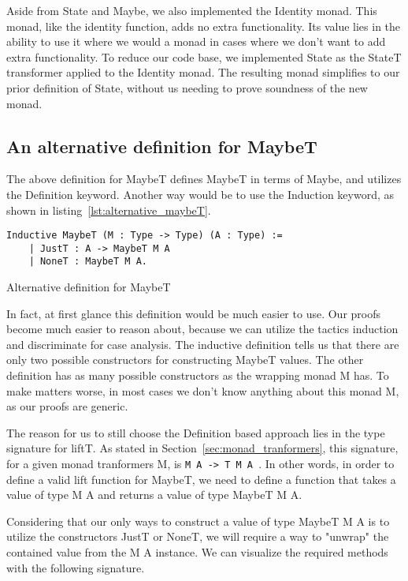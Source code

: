 Aside from State and Maybe, we also implemented the Identity monad. This monad,
like the identity function, adds no extra functionality. Its value lies in the
ability to use it where we would a monad in cases where we don't want to add
extra functionality. To reduce our code base, we implemented State as the
StateT transformer applied to the Identity monad. The resulting monad
simplifies to our prior definition of State, without us needing to prove
soundness of the new monad.

\subsection{An alternative definition for MaybeT}
The above definition for MaybeT defines MaybeT in terms of Maybe, and utilizes
the Definition keyword. Another way would be to use the Induction keyword, as
shown in listing~\ref{lst:alternative_maybeT}.

\begin{listing}
\begin{verbatim}
Inductive MaybeT (M : Type -> Type) (A : Type) :=
    | JustT : A -> MaybeT M A
    | NoneT : MaybeT M A.
\end{verbatim}
\caption{Alternative definition for MaybeT}
\label{lst:alternative_maybeT}
\end{listing}

In fact, at first glance this definition would be much easier to use. Our
proofs become much easier to reason about, because we can utilize the tactics
induction and discriminate for case analysis. The inductive definition tells us
that there are only two possible constructors for constructing MaybeT values.
The other definition has as many possible constructors as the wrapping monad M
has. To make matters worse, in most cases we don't know anything about this
monad M, as our proofs are generic.

The reason for us to still choose the Definition based approach lies in the
type signature for liftT. As stated in Section~\ref{sec:monad_tranformers},
this signature, for a given monad tranformers M, is 
\texttt{M A -> T M A }. In other words, in order to define a valid
lift function for MaybeT, we need to define a function that takes a value of
type M A and returns a value of type MaybeT M A.

Considering that our only ways to construct a value of type MaybeT M A is to
utilize the constructors JustT or NoneT, we will require a way to "unwrap" the
contained value from the M A instance. We can visualize the required methods
with the following signature.

